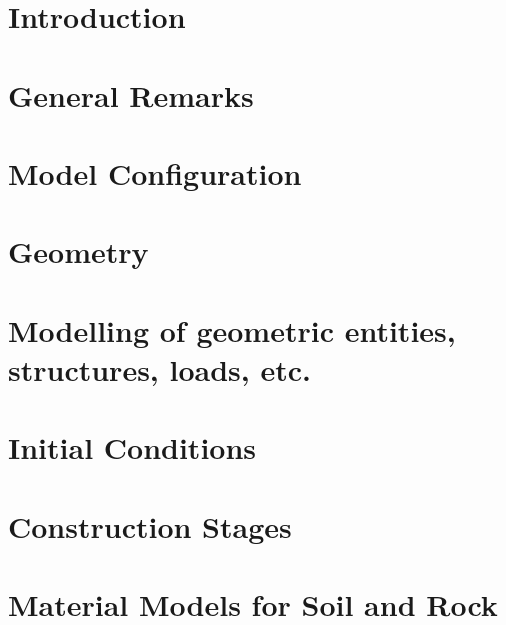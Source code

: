 \documentclass[12pt,a4paper]{report}
\title{\varTitle}
\author{\varAuthor}
\date{\varDate}
\begin{document}
\setlength{\aweboxcontentwidth}{0.81\linewidth}



\tableofcontents

\chapter{Introduction}
\label{chap:introduction}


\chapter{General Remarks}
\label{chap:general}


\chapter{Model Configuration}
\label{chap:setup}


\chapter{Geometry}
\label{chap:geometry}


\chapter{Modelling of geometric entities, structures, loads, etc.}
\label{chap:entities}


\chapter{Initial Conditions}
\label{chap:initial}


\chapter{Construction Stages}
\label{chap:stages}


\chapter{Material Models for Soil and Rock}
\label{chap:materials}

\end{document}
